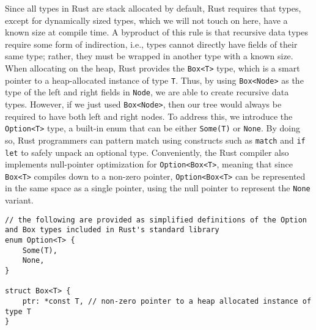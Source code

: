 \documentclass[12pt, letterpaper]{article}
\begin{document}
Since all types in Rust are stack allocated by default\autocite[\href{https://doc.rust-lang.org/rust-by-example/std/box.html}{\S~19.1}]{rust-example}, Rust requires that types, except for dynamically sized types, which we will not touch on here, have a known size at compile time.\autocite[\href{https://doc.rust-lang.org/book/ch20-03-advanced-types.html}{chap.~20~\S~3}]{rust-book} A byproduct of this rule is that recursive data types require some form of indirection, i.e., types cannot directly have fields of their same type; rather, they must be wrapped in another type with a known size.\autocite[\href{https://doc.rust-lang.org/stable/reference/types.html}{\S~10.1}]{rust-reference} When allocating on the heap, Rust provides the \texttt{Box<T>} type, which is a smart pointer to a heap-allocated instance of type \texttt{T}.\autocite[\href{https://doc.rust-lang.org/rust-by-example/std/box.html}{\S~19.1}]{rust-example} Thus, by using \texttt{Box<Node>} as the type of the left and right fields in \texttt{Node}, we are able to create recursive data types. However, if we just used \texttt{Box<Node>}, then our tree would always be required to have both left and right nodes. To address this, we introduce the \texttt{Option<T>} type, a built-in enum that can be either \texttt{Some(T)} or \texttt{None}. By doing so, Rust programmers can pattern match using constructs such as \texttt{match} and \texttt{if let} to safely unpack an optional type.\autocite[\href{https://doc.rust-lang.org/book/ch06-00-enums.html}{chap.~6}]{rust-book} Conveniently, the Rust compiler also implements null-pointer optimization for \texttt{Option<Box<T>}, meaning that since \texttt{Box<T>} compiles down to a non-zero pointer, \texttt{Option<Box<T>} can be represented in the same space as a single pointer, using the null pointer to represent the \texttt{None} variant.\autocites{rust-boxed}{rust-option}
\begin{verbatim}
// the following are provided as simplified definitions of the Option and Box types included in Rust's standard library
enum Option<T> {
    Some(T),
    None,
}

struct Box<T> {
    ptr: *const T, // non-zero pointer to a heap allocated instance of type T
}
\end{verbatim}
\end{document}
